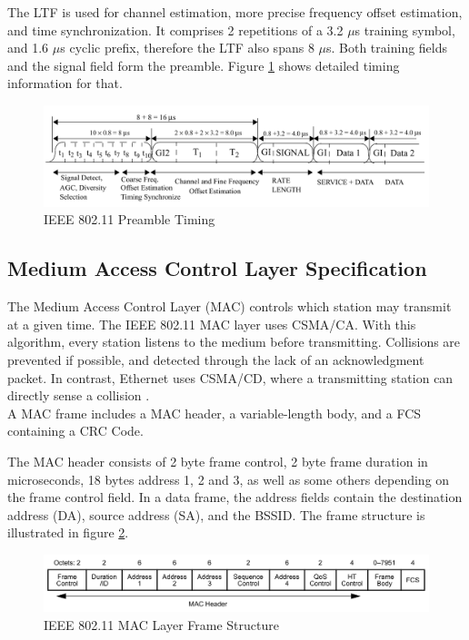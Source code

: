 The \gls{LTF} is used for channel estimation, more precise frequency offset estimation, and time synchronization. It comprises 2 repetitions of a 3.2 $\mu$s training symbol, and 1.6 $\mu$s cyclic prefix, therefore the \gls{LTF} also spans 8 $\mu$s. Both training fields and the signal field form the preamble. Figure \ref{fig:preamble} shows detailed timing information for that.

\begin{figure}[H]
	\centering
	\includegraphics[width=\textwidth]{gfx/images/preamble-format}
	\caption[IEEE 802.11 Preamble Timing]{IEEE 802.11 Preamble Timing \cite{ieee2012}}
	\label{fig:preamble}
\end{figure}


\subsection{Medium Access Control Layer Specification} \label{sec:mac-format}

The Medium Access Control Layer (MAC) controls which station may transmit at a given time. The \gls{IEEE} 802.11 \gls{MAC} layer uses \gls{CSMA/CA}. With this algorithm, every station listens to the medium before transmitting. Collisions are prevented if possible, and detected through the lack of an acknowledgment packet. In contrast, Ethernet uses \gls{CSMA/CD}, where a transmitting station can directly sense a collision \cite{ieee802-3}.\\

A \gls{MAC} frame includes a \gls{MAC} header, a variable-length body, and a \gls{FCS} containing a \gls{CRC} Code.

The \gls{MAC} header consists of 2 byte frame control, 2 byte frame duration in microseconds, 18 bytes address 1, 2 and 3, as well as some others depending on the frame control field. In a data frame, the address fields contain the destination address (DA), source address (SA), and the \gls{BSSID}. The frame structure is illustrated in figure \ref{fig:mac-format}.

\begin{figure}[H]
	\centering
	\includegraphics[width=\textwidth]{gfx/images/mac-format}
	\caption[IEEE 802.11 MAC Layer Frame Structure]{IEEE 802.11 MAC Layer Frame Structure \cite{ieee2012}}
	\label{fig:mac-format}
\end{figure}



